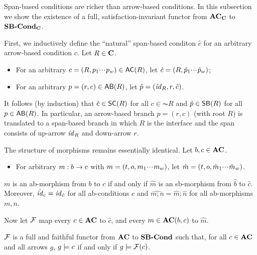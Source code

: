 Span-based conditions are richer than arrow-based conditions. In this subsection we show the existence of a full, satisfaction-invariant functor from $\mathbf{AC}_{\mathbf{C}}$ to $\textbf{SB-Cond}_{\mathbf{C}}$.

First, we inductively define the ``natural'' span-based conditon $\hat c$ for an arbitrary arrow-based condition $c$. Let $R\in\mathbf{C}$.
\begin{itemize}
\item For an arbitrary $c=(R,p_1\ccdots p_w)\in \AC R$, let $\hat c=(R,\hat p_1{\cdotp\mkern-2mu\cdotp\mkern-2mu\cdotp\mkern1mu} \hat p_w)$; 
\item For an arbitrary $p=(r,c)\in \AB R$, let $\hat p=(\mathit{id}_R,r,\hat c)$.
\end{itemize}
%
It follows (by induction) that $\hat c\in \SC R$ for all $c\in \AC R$ and $\hat p\in \SB R$ for all $p\in \AB R$. In particular, an arrow-based branch $p=(r,c)$ (with root $R$) is translated to a span-based branch in which $R$ is the interface and the span consists of up-arrow $\mathit{id}_R$ and down-arrow $r$.

The structure of morphisms remains essentially identical. Let $b,c\in \mathbf{AC}$.
%
\begin{itemize}
\item For arbitrary $m:b\rightarrow c$ with $m=(t,o,m_1{\cdotp\mkern-2mu\cdotp\mkern-2mu\cdotp\mkern1mu} m_w)$, let $\hat m=(t,o,\hat m_1{\cdotp\mkern-2mu\cdotp\mkern-2mu\cdotp\mkern1mu} \hat m_w)$.
\end{itemize}
%
\begin{proposition}
$m$ is an ab-morphism from $b$ to $c$ if and only if $\hat m$ is an sb-morphism from $\hat b$ to $\hat c$. Moreover, $\hat {\mathit{id}}_c=\mathit{id}_{\hat c}$ for all ab-conditions $c$ and $\widehat{m;n}=\hat m;\hat n$ for all ab-morphisms $m,n$.
\end{proposition}
%
Now let $\mathcal{F}$ map every $c\in \mathbf{AC}$ to $\hat c$, and every $m\in \mathbf{AC}(b,c)$ to $\hat m$.

\begin{theorem}
$\mathcal{F}$ is a full and faithful functor from $\mathbf{AC}$ to $\textbf{SB-Cond}$ such that, for all $c\in \mathbf{AC}$ and all arrows $g$, $g\models c$ if and only if $g\models \mathcal{F}(c)$.
\end{theorem}




